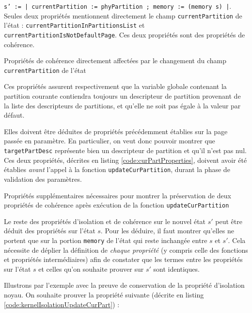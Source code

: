 			\texttt{s' := {| currentPartition := phyPartition ; memory := (memory s) |}}.\\

			Seules deux propriétés mentionnent directement le champ \texttt{currentPartition} de l'état : \texttt{currentPartitionInPartitionsList} et \texttt{currentPartitionIsNotDefaultPage}. Ces deux propriétés sont des propriétés de cohérence.

			\begin{listing}[!ht]
				\caption{Propriétés de cohérence directement affectées par le changement du champ \texttt{currentPartition} de l'état}
				\label{code:consistencyCurPart}
			\end{listing}

			Ces propriétés assurent respectivement que la variable globale contenant la partition courante contiendra toujours un descripteur de partition provenant de la liste des descripteurs de partitions, et qu'elle ne soit pas égale à la valeur par défaut.

			Elles doivent être déduites de propriétés précédemment établies sur la page passée en paramètre. En particulier, on veut donc pouvoir montrer que \texttt{targetPartDesc} représente bien un descripteur de partition et qu'il n'est pas nul. Ces deux propriétés, décrites en listing \ref{code:curPartProperties}, doivent avoir été établies \emph{avant} l'appel à la fonction \texttt{updateCurPartition}, durant la phase de validation des paramètres.

			\begin{listing}[!ht]
				\caption{Propriétés supplémentaires nécessaires pour montrer la préservation de deux propriétés de cohérence après exécution de la fonction \texttt{updateCurPartition}}
				\label{code:curPartProperties}
			\end{listing}

			Le reste des propriétés d'isolation et de cohérence sur le nouvel état $s'$ peut être déduit des propriétés sur l'état $s$. Pour les déduire, il faut montrer qu'elles ne portent que sur la portion \texttt{memory} de l'état qui reste inchangée entre $s$ et $s'$. Cela nécessite de déplier la définition de \emph{chaque propriété} (y compris celle des fonctions et propriétés intermédiaires) afin de constater que les termes entre les propriétés sur l'état $s$ et celles qu'on souhaite prouver sur $s'$ sont identiques.

			Illustrons par l'exemple avec la preuve de conservation de la propriété d'isolation noyau. On souhaite prouver la propriété suivante (décrite en listing \ref{code:kernelIsolationUpdateCurPart}) : 

